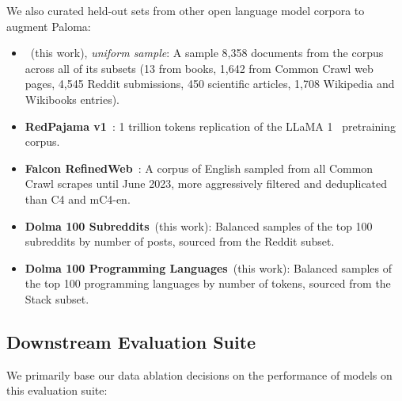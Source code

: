 We also curated held-out sets from other open language model corpora to augment Paloma:
\begin{itemize}[leftmargin=1em]
    \item \textbf{\dolma}~(this work), \textit{uniform sample}: A sample 8,358 documents from the \dolma corpus across all of its subsets (13 from books, 1,642 from Common Crawl web pages, 4,545 Reddit submissions, 450 scientific articles, 1,708 Wikipedia and Wikibooks entries).
    \item \textbf{RedPajama v1}~\citep{redpajama2}: 1 trillion tokens replication of the LLaMA 1~\citep{Touvron2023LLaMAOA} pretraining corpus.
    \item \textbf{Falcon RefinedWeb}~\citep{Penedo2023TheRD}: A corpus of English sampled from all Common Crawl scrapes until June 2023, more aggressively filtered and deduplicated than C4 and mC4-en.
    \item \textbf{Dolma 100 Subreddits}~(this work): Balanced samples of the top 100 subreddits by number of posts, sourced from the \dolma Reddit subset.
    \item \textbf{Dolma 100 Programming Languages}~(this work): Balanced samples of the top 100 programming languages by number of tokens, sourced from the \dolma Stack subset.
\end{itemize}

\subsection{Downstream Evaluation Suite}
\label{sec:setup:downstream}

We primarily base our data ablation decisions on the performance of models on this evaluation suite:


